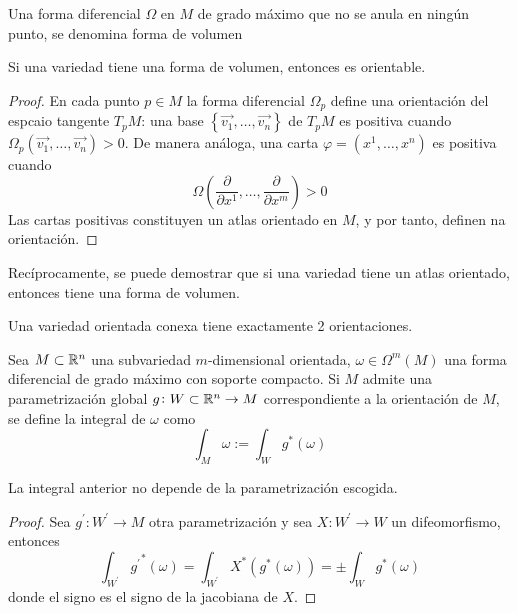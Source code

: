\begin{defi}
    Una forma diferencial $\Omega$ en $M$ de grado máximo que no se anula en ningún punto, se denomina forma de volumen
\end{defi}

\begin{prop*}
    Si una variedad tiene una forma de volumen, entonces es orientable.
\end{prop*}

\begin{proof}
    En cada punto $p \in M$ la forma diferencial $\Omega_p$ define una orientación del espcaio tangente $T_pM$:
    una base $\left\{ \vec{v_1}, \dots, \vec{v_n} \right\}$ de $T_pM$ es positiva cuando
    $\Omega_p\left( \vec{v_1}, \dots, \vec{v_n} \right) > 0$. De manera análoga, una carta $\varphi = \left( x^1, \dots, x^n \right)$
    es positiva cuando
    \[
        \Omega\left( \frac{\partial}{\partial x^1}, \dots, \frac{\partial}{\partial x^m} \right) > 0
    \]
    Las cartas positivas constituyen un atlas orientado en $M$, y por tanto, definen na orientación.
\end{proof}

\begin{obs*}
    Recíprocamente, se puede demostrar que si una variedad tiene un atlas orientado, entonces tiene una forma de volumen.
\end{obs*}

\begin{obs}
    Una variedad orientada conexa tiene exactamente 2 orientaciones.
\end{obs}

\begin{defi}
    Sea $M \subset \mathbb{R}^n$ una subvariedad $m$-dimensional orientada, $\omega \in \Omega^m\left( M \right)$ una forma diferencial
    de grado máximo con soporte compacto. Si $M$ admite una parametrización global $g \colon W \subset \mathbb{R}^n \to M$ correspondiente
    a la orientación de $M$, se define la integral de $\omega$ como
    \[
        \int_M \omega := \int_W g^\ast(\omega)
    \]
\end{defi}

\begin{lema*}
    La integral anterior no depende de la parametrización escogida.
\end{lema*}

\begin{proof}
    Sea $g^\prime \colon W^\prime \to M$ otra parametrización y sea $X \colon W^\prime \to W$ un difeomorfismo, entonces
    \[
        \int_{W^\prime} {g^\prime}^\ast(\omega) = \int_{W^\prime} X^\ast\left( g^\ast(\omega) \right) = \pm \int_W g^\ast(\omega)
    \]
    donde el signo es el signo de la jacobiana de $X$.
\end{proof}

